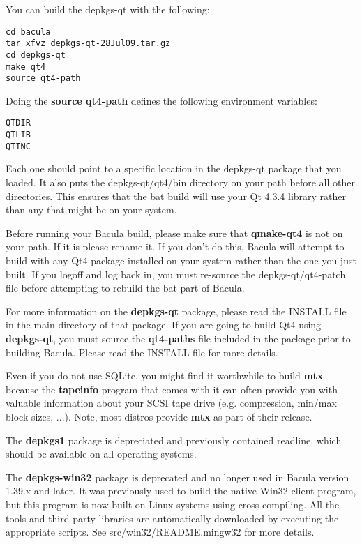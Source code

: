 You can build the depkgs-qt with the following:

\footnotesize
\begin{verbatim}
cd bacula
tar xfvz depkgs-qt-28Jul09.tar.gz
cd depkgs-qt
make qt4
source qt4-path
\end{verbatim}
\normalsize

Doing the {\bf source qt4-path} defines the following environment
variables:

\footnotesize
\begin{verbatim}
QTDIR
QTLIB
QTINC
\end{verbatim}
\normalsize

Each one should point to a specific location in the depkgs-qt package
that you loaded.  It also puts the depkgs-qt/qt4/bin directory
on your path before all other directories.  This ensures that
the bat build will use your Qt 4.3.4 library rather than any that 
might be on your system.

Before running your Bacula build, please make sure that
{\bf qmake-qt4} is not on your path.  If it is please rename it. If
you don't do this, Bacula will attempt to build with any Qt4 package
installed on your system rather than the one you just built.
If you logoff and log back in, you must re-source the depkgs-qt/qt4-patch
file before attempting to rebuild the bat part of Bacula.

For more information on the {\bf depkgs-qt} package, please read the
INSTALL file in the main directory of that package. If you are going to 
build Qt4 using {\bf depkgs-qt}, you must source the {\bf qt4-paths} file
included in the package prior to building Bacula. Please read the INSTALL
file for more details.

Even if you do not use SQLite, you might find it worthwhile to build {\bf mtx}
because the {\bf tapeinfo} program that comes with it can often provide you
with valuable information about your SCSI tape drive (e.g. compression,
min/max block sizes, ...). Note, most distros provide {\bf mtx} as part of 
their release.

The {\bf depkgs1} package is depreciated and previously contained
readline, which should be available on all operating systems.

The {\bf depkgs-win32} package is deprecated and no longer used in 
Bacula version 1.39.x and later. It was previously used to build
the native Win32 client program, but this program is now built on Linux
systems using cross-compiling.  All the tools and third party libraries
are automatically downloaded by executing the appropriate scripts.  See
src/win32/README.mingw32 for more details.

